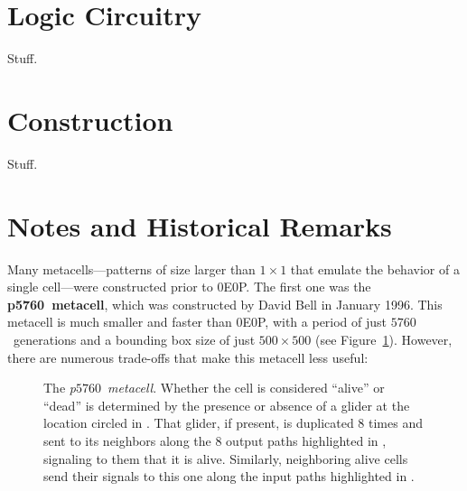 \section{Logic Circuitry}

Stuff.

\section{Construction}

Stuff.


\section{Notes and Historical Remarks}\label{sec:0e0p_history}

Many metacells---patterns of size larger than $1 \times 1$ that emulate the behavior of a single cell---were constructed prior to 0E0P. The first one was the \textbf{p5760~metacell}, which was constructed by David Bell in January 1996. This metacell is much smaller and faster than 0E0P, with a period of just $5760$~generations and a bounding box size of just $500 \times 500$ (see Figure~\ref{fig:p5760_metacell}). However, there are numerous trade-offs that make this metacell less useful:\smallskip

\begin{figure}[!htb]
	\centering
	\caption{The \emph{p$5760$~metacell}. Whether the cell is considered ``alive'' or ``dead'' is determined by the presence or absence of a glider at the location circled in . That glider, if present, is duplicated $8$ times and sent to its neighbors along the $8$ output paths highlighted in , signaling to them that it is alive. Similarly, neighboring alive cells send their signals to this one along the input paths highlighted in .}\label{fig:p5760_metacell}
\end{figure}

